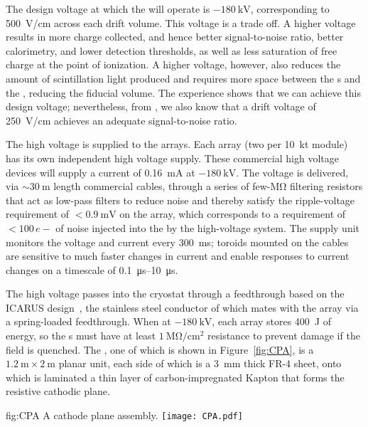 The design voltage at which the   will operate is $-\SI{180}{\kilo\volt}$, corresponding to \SI{500}{\volt/\cm} across each drift volume. This voltage is a trade off. A higher voltage results in more charge collected, and hence better signal-to-noise ratio, better calorimetry, and lower detection thresholds, as well as less saturation of free charge at the point of ionization. A higher voltage, however, also reduces the amount of scintillation light produced and requires more space between the s and the , reducing the fiducial volume. The  experience shows that we can achieve this design voltage; nevertheless, from , we also know that a drift voltage of \SI{250}{\volt/\cm} achieves an adequate signal-to-noise ratio.

The high voltage is supplied to the  arrays. Each  array (two per \SI{10}{\kilo\tonne} module) has its own independent high voltage supply. These commercial high voltage devices will supply a current of \SI{0.16}{\milli\ampere} at $-\SI{180}{\kilo\volt}$. The voltage is delivered, via $\sim\!\SI{30}{\meter}$ length commercial cables, through a series of few-\si{\mega\ohm} filtering resistors that act as low-pass filters to reduce noise and thereby satisfy the ripple-voltage requirement of $<\!\SI{0.9}{\milli\volt}$ on the  array, which corresponds to a requirement of $<\!100\,e{-}$ of noise injected into the  by the high-voltage system. The supply unit monitors the voltage and current every \SI{300}{\milli\second}; toroids mounted on the cables are sensitive to much faster changes in current and enable responses to current changes on a timescale of \SIrange{0.1}{10}{\micro\second}.

The high voltage passes into the cryostat through a feedthrough based on the ICARUS design~\cite{Icarus-T600}, the stainless steel conductor of which mates with the  array via a spring-loaded feedthrough.
When at $-\SI{180}{\kilo\volt}$, each  array stores \SI{400}{\joule} of energy, so the s must have at least $\SI{1}{\mega\ohm/\cm^{2}}$ resistance to prevent damage if the field is quenched. The , one of which is shown in Figure~\ref{fig:CPA}, is a $\SI{1.2}{\meter}\times\SI{2}{\meter}$ planar unit, each side of which is a \SI{3}{\mm} thick FR-4 sheet, onto which is laminated a thin layer of carbon-impregnated Kapton that forms the resistive cathodic plane.

\begin{dunefigure}{fig:CPA}
{A cathode plane assembly.}
\texttt{[image: CPA.pdf]}
\end{dunefigure}

